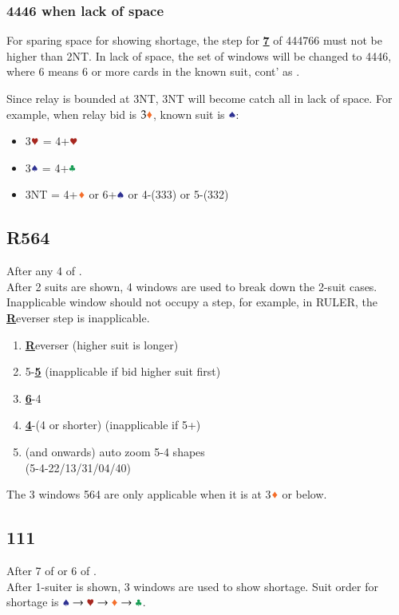 \documentclass{article}
\begin{document}
\begin{multicols}{2}
\pagebreak

\subsubsection{4446 when lack of space}\label{sec:4446}
For sparing space for showing shortage, the step for \textbf{\underline{7}} of 444766 must not be higher than 2NT. In lack of space, the set of windows will be changed to 4446, where 6 means 6 or more cards in the known suit, cont' as .

\noindent Since relay is bounded at 3NT, 3NT will become catch all in lack of space. For example, when relay bid is $3\ddd$, known suit is $\sss$:
\begin{itemize}
    \item 3$\hhh$ = 4+$\hhh$
    \item 3$\sss$ = 4+$\ccc$
    \item 3NT = 4+$\ddd$ or 6+$\sss$ or 4-(333) or 5-(332)
\end{itemize}

\subsection{R564}\label{sec:R564}
After any 4 of . \\
After 2 suits are shown, 4 windows are used to break down the 2-suit cases. Inapplicable window should not occupy a step, for example, in RULER, the \textbf{\underline{R}}everser step is inapplicable.

\begin{enumerate}
    \item \textbf{\underline{R}}everser (higher suit is longer)
    \item 5-\textbf{\underline{5}} (inapplicable if bid higher suit first)
    \item \textbf{\underline{6}}-4
    \item \textbf{\underline{4}}-(4 or shorter) (inapplicable if 5+)
    \item (and onwards) auto zoom 5-4 shapes \\
        (5-4-22/13/31/04/40)
\end{enumerate}

\noindent The 3 windows 564 are only applicable when it is at 3$\ddd$ or below.

\subsection{111}\label{sec:111}
After 7 of  or 6 of . \\
After 1-suiter is shown, 3 windows are used to show shortage. Suit order for shortage is $\sss \rightarrow \hhh \rightarrow \ddd \rightarrow \ccc$.


\end{multicols}
\end{document}
